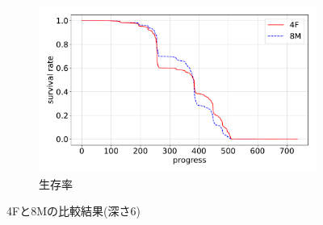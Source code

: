 \begin{figure}[t]
\begin{subfigure}[b]{0.8\linewidth}
    \includegraphics[width=\linewidth]{pdf/compare/EXP6_NT4F_and_NT8M/survival.pdf}
    \caption{生存率}
    \label{figEXP6_:NT4F_and_NT8M_survival}
\end{subfigure}
\caption{4Fと8Mの比較結果(深さ6)}
\label{fig:EXP6_NT4FとNT8M_results}
\end{figure}
    

